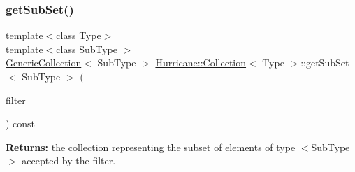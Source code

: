 \subsubsection{\texorpdfstring{get\+Sub\+Set()}{getSubSet()}\hspace{0.1cm}{\footnotesize\ttfamily [3/3]}}
{\footnotesize\ttfamily template$<$class Type$>$ \\
template$<$class Sub\+Type $>$ \\
\mbox{\hyperlink{classHurricane_1_1GenericCollection}{Generic\+Collection}}$<$ Sub\+Type $>$ \mbox{\hyperlink{classHurricane_1_1Collection}{Hurricane\+::\+Collection}}$<$ Type $>$\+::get\+Sub\+Set$<$ Sub\+Type $>$ (\begin{DoxyParamCaption}\item[{const \mbox{\hyperlink{classHurricane_1_1Filter}{Filter}}$<$ Sub\+Type $>$ \&}]{filter }\end{DoxyParamCaption}) const\hspace{0.3cm}{\ttfamily [inline]}}

{\bfseries Returns\+:} the collection representing the subset of elements of type {\ttfamily $<$Sub\+Type$>$} accepted by the filter.

